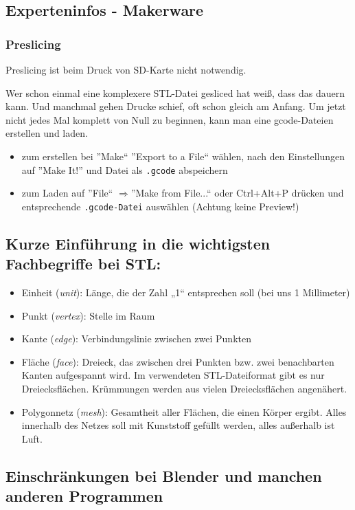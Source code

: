 \documentclass{\basedir/fablab-document}
\newcommand{\fachbegriff}[1]{(\textit{#1})}
\newcommand{\ra}{$\Rightarrow$}
\begin{document}
\subsection{Experteninfos - Makerware} \label{expinfos}
\subsubsection{Preslicing}
Preslicing ist beim Druck von SD-Karte nicht notwendig.

Wer schon einmal eine komplexere STL-Datei gesliced hat weiß, dass das dauern kann. Und manchmal gehen Drucke schief,
oft schon gleich am Anfang. Um jetzt nicht jedes Mal komplett von Null zu beginnen, kann man eine gcode-Dateien erstellen
und laden.
\begin{itemize}
\item zum erstellen bei ''Make`` ''Export to a File`` wählen, nach den Einstellungen auf ''Make It!'' und Datei als \texttt{.gcode} abspeichern
\item zum Laden auf ''File`` \ra ''Make from File...`` oder Ctrl+Alt+P drücken und entsprechende \texttt{.gcode-Datei} auswählen (Achtung keine Preview!)
\end{itemize}

\subsection{Kurze Einführung in die wichtigsten Fachbegriffe bei STL:}

\begin{itemize}
\item Einheit \fachbegriff{unit}: Länge, die der Zahl „1“ entsprechen soll (bei uns
1 Millimeter)
\item Punkt \fachbegriff{vertex}: Stelle im Raum
\item Kante \fachbegriff{edge}: Verbindungslinie zwischen zwei Punkten
\item Fläche \fachbegriff{face}: Dreieck, das zwischen drei Punkten bzw. zwei
benachbarten Kanten aufgespannt wird. Im verwendeten STL-Dateiformat
gibt es nur Dreiecksflächen. Krümmungen werden aus vielen
Dreiecksflächen angenähert.
\item Polygonnetz \fachbegriff{mesh}: Gesamtheit aller Flächen, die einen Körper
ergibt. Alles innerhalb des Netzes soll mit Kunststoff gefüllt werden,
alles außerhalb ist Luft.
\end{itemize}

\subsection{Einschränkungen bei Blender und manchen anderen Programmen} \label{lowlevel-einschraenkungen}
\end{document}
